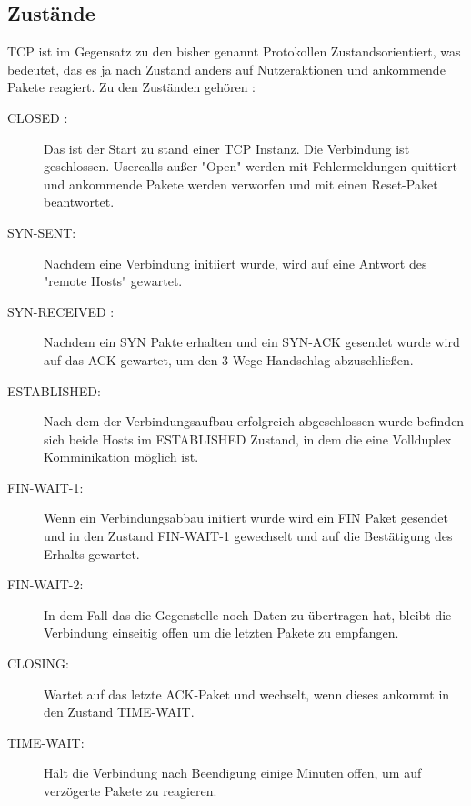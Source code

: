 \subsection{Zustände}
TCP ist im Gegensatz zu den bisher genannt Protokollen Zustandsorientiert, was bedeutet, das es ja nach Zustand anders auf Nutzeraktionen und ankommende Pakete reagiert. 
Zu den Zuständen gehören :

\begin{description}

\item[CLOSED : ]Das ist der Start zu stand einer TCP Instanz. Die Verbindung ist geschlossen. Usercalls außer "Open" werden mit Fehlermeldungen quittiert und ankommende Pakete werden verworfen und mit einen Reset-Paket beantwortet.
\item[SYN-SENT: ]Nachdem eine Verbindung initiiert wurde, wird auf eine Antwort des "remote Hosts" gewartet. 
\item[SYN-RECEIVED : ] Nachdem ein SYN Pakte erhalten und ein SYN-ACK gesendet wurde wird auf das ACK gewartet, um den 3-Wege-Handschlag abzuschließen. 
\item[ESTABLISHED: ] Nach dem der Verbindungsaufbau erfolgreich abgeschlossen wurde befinden sich beide Hosts im ESTABLISHED Zustand, in dem die eine Vollduplex Komminikation möglich ist. 
\item[FIN-WAIT-1: ] Wenn ein Verbindungsabbau initiert wurde wird ein FIN Paket gesendet und in den Zustand FIN-WAIT-1 gewechselt und auf die Bestätigung des Erhalts gewartet. 
\item[FIN-WAIT-2: ] In dem Fall das die Gegenstelle noch Daten zu übertragen hat, bleibt die Verbindung einseitig offen um die letzten Pakete zu empfangen. 
\item[CLOSING: ]	Wartet auf das letzte ACK-Paket und wechselt, wenn dieses ankommt in den Zustand TIME-WAIT.
\item[TIME-WAIT: ] Hält die Verbindung nach Beendigung einige Minuten offen, um auf verzögerte Pakete zu reagieren.
\end{description}

